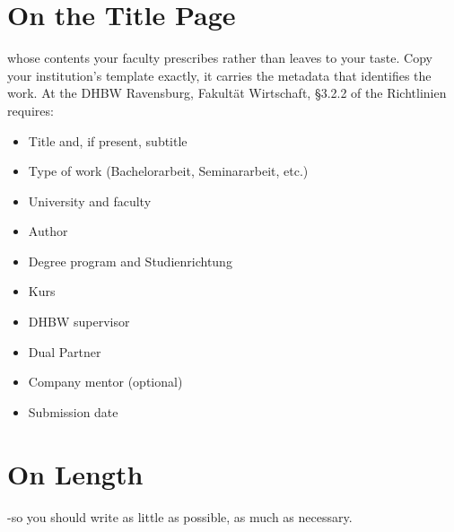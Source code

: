 \documentclass{../sharedAssets/tufte}
\begin{document}
\section{On the Title Page}
 whose contents your faculty prescribes rather than leaves to your taste. Copy your institution's template exactly, it carries the metadata that identifies the work. At the DHBW Ravensburg, Fakult\"at Wirtschaft, \S3.2.2 of the Richtlinien~\cite{DHBWRavensburgRichtlinien2025} requires:
\begin{itemize}
  \item Title and, if present, subtitle
  \item Type of work (Bachelorarbeit, Seminararbeit, etc.)
  \item University and faculty
  \item Author
  \item Degree program and Studienrichtung
  \item Kurs
  \item DHBW supervisor
  \item Dual Partner
  \item Company mentor (optional)
  \item Submission date
\end{itemize}

\section{On Length}
   -so you should write as little as possible, as much as necessary.

\end{document}
